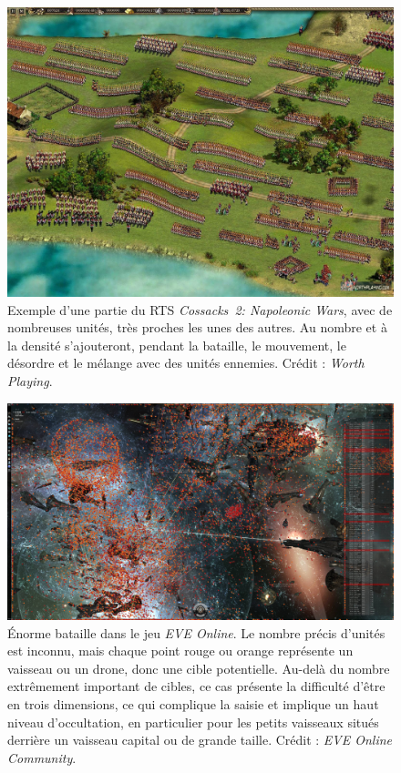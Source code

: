 	
	\begin{figure}[ht]
		\centering
		\includegraphics[width=\textwidth]{figures/cossacks2}
		\caption{Exemple d'une partie du RTS \emph{Cossacks~2: Napoleonic Wars}, avec de nombreuses unités, très proches les unes des autres. Au nombre et à la densité s'ajouteront, pendant la bataille, le mouvement, le désordre et le mélange avec des unités ennemies. Crédit : \emph{Worth Playing}.}
		\label{fig:cossacks2}
	\end{figure}
	
	\begin{figure}[ht]
		\centering
		\includegraphics[width=\textwidth]{figures/eveonline}
		\caption{Énorme bataille dans le jeu \emph{EVE Online}. Le nombre précis d'unités est inconnu, mais chaque point rouge ou orange représente un vaisseau ou un drone, donc une cible potentielle. Au-delà du nombre extrêmement important de cibles, ce cas présente la difficulté d'être en trois dimensions, ce qui complique la saisie et implique un haut niveau d'occultation, en particulier pour les petits vaisseaux situés derrière un vaisseau capital ou de grande taille. Crédit : \emph{EVE Online Community}.}
		\label{fig:eveonline}
	\end{figure}
	

